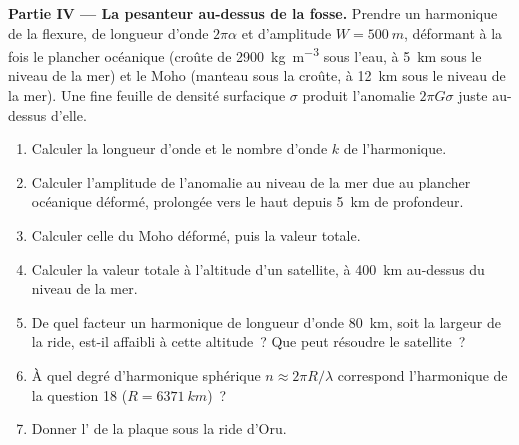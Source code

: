 \begin{problem}
\noindent\textbf{Partie IV --- La pesanteur au-dessus de la fosse.} Prendre un harmonique de
la flexure, de longueur d'onde $2\pi\alpha$ et d'amplitude $W = \qty{500}{m}$, déformant
à la fois le plancher océanique (croûte de \qty{2900}{kg.m^{-3}} sous l'eau, à \qty{5}{km} sous
le niveau de la mer) et le Moho (manteau sous la croûte, à \qty{12}{km} sous le niveau de la mer). Une
fine feuille de densité surfacique $\sigma$ produit l'anomalie $2\pi G\sigma$
juste au-dessus d'elle.
\begin{enumerate}[resume]
  \item Calculer la longueur d'onde et le nombre d'onde $k$ de l'harmonique.
  \item Calculer l'amplitude de l'anomalie au niveau de la mer due au plancher
        océanique déformé, prolongée vers le haut depuis \qty{5}{km} de profondeur.
  \item Calculer celle du Moho déformé, puis la valeur totale.
  \item Calculer la valeur totale à l'altitude d'un satellite, à \qty{400}{km} au-dessus
        du niveau de la mer.
  \item De quel facteur un harmonique de longueur d'onde \qty{80}{km}, soit la largeur de
        la ride, est-il affaibli à cette altitude~? Que peut résoudre le satellite~?
  \item À quel degré d'harmonique sphérique $n \approx 2\pi R/\lambda$ correspond
        l'harmonique de la question 18 ($R = \qty{6371}{km}$)~?
  \item Donner l' de la plaque sous la ride
        d'Oru.
\end{enumerate}
\end{problem}
